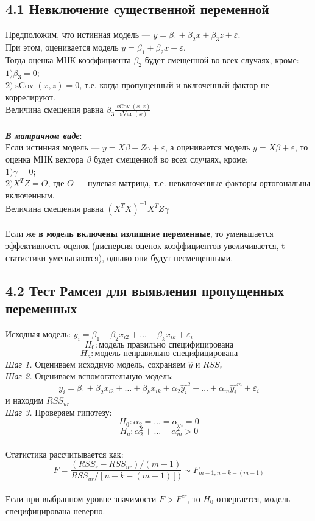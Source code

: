 \documentclass[a0,final]{a0poster}
\DeclareMathOperator{\sVar}{sVar}
\DeclareMathOperator{\sCov}{sCov}
\begin{document}
\begin{multicols}{4}
\subsection*{4.1 Невключение существенной переменной}
Предположим, что истинная модель — $y = \beta_1 + \beta_2x + \beta_3z + \varepsilon$. \\
При этом, оценивается модель $y = \beta_1 + \beta_2x + \varepsilon$.\\
Тогда оценка МНК коэффициента $\beta_2$ будет смещенной во всех случаях, кроме: \\
$1) \beta_3 = 0;$\\
$2) \sCov(x, z) = 0$, т.е. когда пропущенный и включенный фактор не коррелируют. \\
Величина смещения равна $\beta_3\frac{\sCov(x, z)}{\sVar(x)}$\\ \\
\textbf{\textit{В матричном виде}}: \\
Если истинная модель — $y = X\beta + Z\gamma + \varepsilon$, а оценивается модель $y = X\beta + \varepsilon$, то оценка МНК вектора $\beta$ будет смещенной во всех случаях, кроме: \\
$1) \gamma = 0;$\\
$2) X^TZ = O$, где $O$ — нулевая матрица, т.е. невключенные факторы ортогональны включенным.\\
Величина смещения равна $(X^TX)^{-1}X^TZ\gamma$ \\
\\
Если же \textbf{в модель включены излишние переменные}, то уменьшается эффективность оценок (дисперсия оценок коэффициентов увеличивается, t-статистики уменьшаются), однако они будут несмещенными.

\subsection*{4.2 Тест Рамсея для выявления пропущенных переменных}
Исходная модель: $y_i = \beta_1 + \beta_2x_{i2} + \ldots + \beta_kx_{ik} +\varepsilon_i$ \\
\[H_0: \text{модель правильно специфицирована} \]
\[H_a: \text{модель неправильно специфицирована} \]
\textit{Шаг 1.} Оцениваем исходную модель, сохраняем $\hat{y}$ и $RSS_{r}$ \\
\textit{Шаг 2.} Оцениваем вспомогательную модель:
\[y_i = \beta_1 + \beta_2x_{i2} + \ldots + \beta_kx_{ik} + \alpha_2\hat{y_i}^2 + \ldots + \alpha_m\hat{y_i}^m +\varepsilon_i\]
и находим $RSS_{ur}$ \\
\textit{Шаг 3.} Проверяем гипотезу:
\[H_0: \alpha_2 = \ldots = \alpha_m = 0\]
\[H_a: \alpha_2^2 + \ldots + \alpha_m^2 > 0 \]
\\
Статистика рассчитывается как:
\[F = \frac{(RSS_r - RSS_{ur})/(m-1)}{RSS_{ur}/[n-k-(m-1)])} \sim F_{m-1, n-k-(m-1)}\]
\\
Если при выбранном уровне значимости $F>F^{cr}$, то $H_0$ отвергается, модель специфицирована неверно.


\end{multicols}
\end{document}
